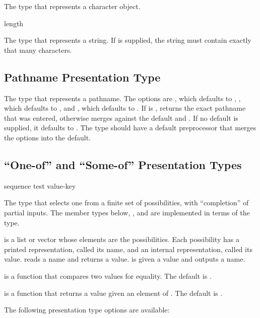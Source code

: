  {}

The type that represents a character object.

 {\optional length}

The type that represents a string.  If  is supplied, the string
must contain exactly that many characters.


\subsection {Pathname Presentation Type}

 { }

The type that represents a pathname.  The options are ,
which defaults to , , which defaults to ,
and , which defaults to .  If 
is ,  returns the exact pathname that was entered,
otherwise  merges against the default and .  If
no default is supplied, it defaults to .  The
 type should have a default preprocessor that merges the options
into the default.


\subsection {``One-of'' and ``Some-of'' Presentation Types}

 {sequence \key test value-key}

The type that selects one from a finite set of possibilities, with
``completion'' of partial inputs.  The member types below, ,
and  are implemented in terms of the  type.

 is a list or vector whose elements are the possibilities.  Each
possibility has a printed representation, called its name, and an internal
representation, called its value.   reads a name and returns a value.
 is given a value and outputs a name.

 is a function that compares two values for equality.  The default is
.

 is a function that returns a value given an element of
.  The default is .

The following presentation type options are available:

